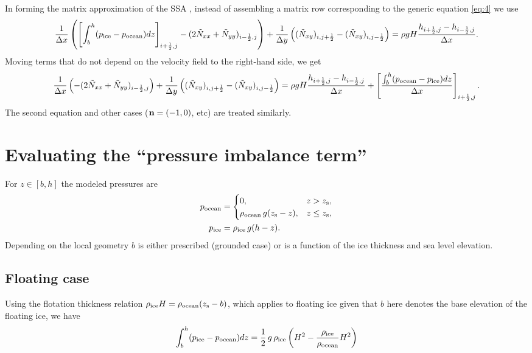 \documentclass[11pt]{article}
\begin{document}
In forming the matrix approximation of the SSA \cite{BBssasliding,Winkelmannetal2011}, instead of assembling a matrix row corresponding to the generic equation \eqref{eq:4} we use
\begin{equation*}
\frac1{\Delta x}\left(\left[\int_{b}^{h}(p_{\text{ice}} - p_{\text{ocean}}) dz\right]_{i+\frac12,j} - (2\tilde N_{xx} + \tilde N_{yy})_{i-\frac12,j}\right) +
\frac1{\Delta y}\left((\tilde N_{xy})_{i,j+\frac12} - (\tilde N_{xy})_{i,j-\frac12}\right) =
\rho g H \frac{h_{i+\frac12,j} - h_{i-\frac12,j}}{\Delta x}.
\end{equation*}
Moving terms that do not depend on the velocity field to the
right-hand side, we get
\begin{equation*}
\frac1{\Delta x}\left(- (2\tilde N_{xx} + \tilde N_{yy})_{i-\frac12,j}\right) +
\frac1{\Delta y}\left((\tilde N_{xy})_{i,j+\frac12} - (\tilde N_{xy})_{i,j-\frac12}\right) =
\rho g H \frac{h_{i+\frac12,j} - h_{i-\frac12,j}}{\Delta x} + \left[\frac{\int_{b}^{h}(p_{\text{ocean}} - p_{\text{ice}}) dz}{\Delta x}\right]_{i+\frac12,j}.
\end{equation*}
The second equation and other cases ($\mathbf{n} = (-1,0)$, etc) are treated
similarly.

\section{Evaluating the ``pressure imbalance term''}
\label{sec-5}

For $z \in [b, h]$ the modeled pressures are
\begin{align}
p_{\text{ocean}} &= 
\begin{cases}
0, & z > z_{\text{s}},\\
\rho_{\text{ocean}}\, g (z_{\text{s}} - z), & z \le z_{\text{s}},
\end{cases}\\
p_{\text{ice}} &= \rho_{\text{ice}}\, g (h - z).
\end{align}
Depending on the local geometry $b$ is either prescribed (grounded
case) or is a function of the ice thickness and sea level elevation.

\subsection{Floating case}
\label{sec-5-1}

Using the flotation thickness relation $\rho_{\text{ice}} H = \rho_{\text{ocean}} (z_{\text{s}} - b)$, which applies to floating ice given that $b$ here denotes the base elevation of the floating ice, we have
\begin{equation*}
\int_{b}^{h}(p_{\text{ice}} - p_{\text{ocean}}) dz =
 \frac{1}{2}\, g\, \rho_{\text{ice}} \left(H^2 - \frac{\rho_{\text{ice}}}{\rho_{\text{ocean}}} H^2\right)
\end{equation*}
\end{document}

